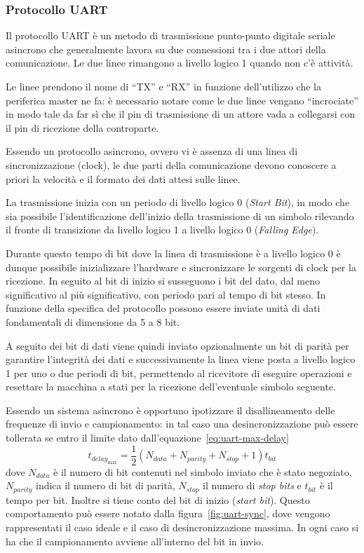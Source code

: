 \subsubsection{Protocollo UART}\label{ss:uart}

Il protocollo UART è un metodo di trasmissione punto-punto digitale seriale asincrono che generalmente lavora su due connessioni tra i due attori della comunicazione. Le due linee rimangono a livello logico 1 quando non c'è attività.

Le linee prendono il nome di ``TX'' e ``RX'' in funzione dell'utilizzo che la periferica master ne fa: è necessario notare come le due linee vengano ``incrociate'' in modo tale da far sì che il pin di trasmissione di un attore vada a collegarsi con il pin di ricezione della controparte.

Essendo un protocollo asincrono, ovvero vi è assenza di una linea di sincronizzazione (clock), le due parti della comunicazione devono conoscere a priori la velocità e il formato dei dati attesi sulle linee.

La trasmissione inizia con un periodo di livello logico 0 (\textit{Start Bit}), in modo che sia possibile l'identificazione dell'inizio della trasmissione di un simbolo rilevando il fronte di transizione da livello logico 1 a livello logico 0 (\textit{Falling Edge}).

Durante questo tempo di bit dove la linea di trasmissione è a livello logico 0 è dunque possibile inizializzare l'hardware e sincronizzare le sorgenti di clock per la ricezione. In seguito al bit di inizio si susseguono i bit del dato, dal meno significativo al più significativo, con periodo pari al tempo di bit stesso. In funzione della specifica del protocollo possono essere inviate unità di dati fondamentali di dimensione da 5 a 8 bit.

A seguito dei bit di dati viene quindi inviato opzionalmente un bit di parità per garantire l'integrità dei dati e successivamente la linea viene posta a livello logico 1 per uno o due periodi di bit, permettendo al ricevitore di eseguire operazioni e resettare la macchina a stati per la ricezione dell'eventuale simbolo seguente.\cite{site:rs-uart}

Essendo un sistema asincrono è opportuno ipotizzare il disallineamento delle frequenze di invio e campionamento: in tal caso una desincronizzazione può essere tollerata se entro il limite dato dall'equazione~\ref{eq:uart-max-delay}
\begin{equation}\label{eq:uart-max-delay}
    t_{delay_{\max}} = \frac{1}{2}(N_{data}+N_{parity}+N_{stop}+1)t_{bit}    
\end{equation}
dove \(N_{data}\) è il numero di bit contenuti nel simbolo inviato che è stato negoziato, \(N_{parity}\) indica il numero di bit di parità, \(N_{stop}\) il numero di \textit{stop bits} e \(t_{bit}\) è il tempo per bit. Inoltre si tiene conto del bit di inizio (\textit{start bit}). Questo comportamento può essere notato dalla figura~\ref{fig:uart-sync}, dove vengono rappresentati il caso ideale e il caso di desincronizzazione massima. In ogni caso si ha che il campionamento avviene all'interno del bit in invio.

